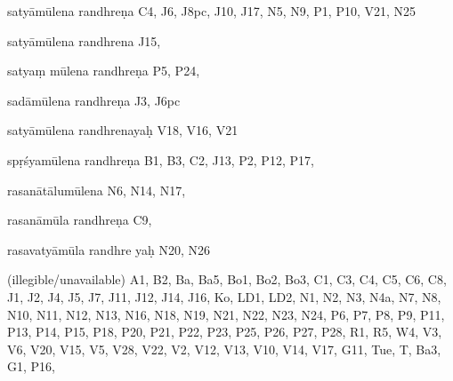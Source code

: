 \begin{ekdosis}
\begin{marma}[hp01_055]
\begin{marma}[hp02_009]
\begin{marma}[hp02_011]
\begin{marma}[hp02_55a]
\begin{description}
    \end{description}
 \end{marma}


 \begin{marma}[hp02_56*1]
\item[satyāmūlena randhreṇa] C4, J6, J8pc, J10, J17, N5, N9, P1, P10, V21, N25
\item[satyāmūlena randhrena] J15,
\item[satyaṃ mūlena randhreṇa] P5, P24, 
\item[sadāmūlena randhreṇa] J3, J6pc
\item[satyāmūlena randhrenayaḥ] V18, V16, V21
\item[spṛśyamūlena randhreṇa] B1, B3, C2, J13, P2, P12, P17, 
\item[rasanātālumūlena] N6, N14, N17, 
\item[rasanāmūla randhreṇa] C9, 
\item[rasavatyāmūla randhre yaḥ] N20, N26
\item[]
\item[]
\item[(illegible/unavailable)] A1, B2, Ba, Ba5, Bo1, Bo2, Bo3, C1, C3, C4, C5, C6, C8, J1, J2, J4, J5, J7, J11, J12, J14, J16, Ko, LD1, LD2, N1, N2, N3, N4a, N7, N8, N10, N11, N12, N13, N16, N18, N19, N21, N22, N23, N24, P6, P7, P8, P9, P11, P13, P14, P15, P18, P20, P21, P22, P23, P25, P26, P27, P28, R1, R5, W4, V3, V6, V20, V15, V5, V28, V22, V2, V12, V13, V10, V14, V17, G11, Tue, T, Ba3, G1, P16,
  \begin{description}

    \end{description}
 \end{marma}



\end{marma}
\end{marma}
\end{marma}
\end{ekdosis}
